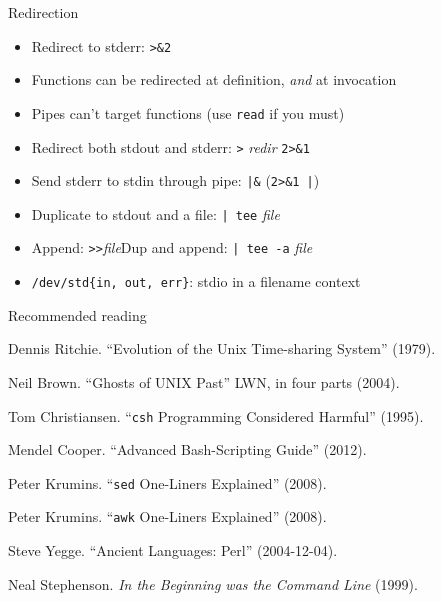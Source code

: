 \documentclass[mathserif,xcolor={dvipsnames,table}]{beamer}
\begin{document}
\begin{frame}{Redirection}
\begin{itemize}
\item Redirect to stderr: \texttt{>\&2}
\item Functions can be redirected at definition, \textit{and} at invocation
\item Pipes can't target functions (use \texttt{read} if you must)
\item Redirect both stdout and stderr: \texttt{>} \textit{redir} \texttt{2>\&1}
\item Send stderr to stdin through pipe: \texttt{|\&} (\texttt{2>\&1 |})
\item Duplicate to stdout and a file: \texttt{| tee} \textit{file}
\item Append: \texttt{>}\texttt{>}\textit{file}\hfill Dup and append: \texttt{| tee -a} \textit{file}
\item \texttt{/dev/std\{in, out, err\}}: stdio in a filename context
\end{itemize}
\end{frame}

\begin{frame}{Recommended reading}
\begin{itemize}
\small{
\item Dennis Ritchie. ``Evolution of the Unix Time-sharing System'' (1979).
\item Neil Brown. ``Ghosts of UNIX Past'' LWN, in four parts (2004).
\item Tom Christiansen. ``\texttt{csh} Programming Considered Harmful'' (1995).
\item Mendel Cooper. ``Advanced Bash-Scripting Guide'' (2012).
\item Peter Krumins. ``\texttt{sed} One-Liners Explained'' (2008).
\item Peter Krumins. ``\texttt{awk} One-Liners Explained'' (2008).
\item Steve Yegge. ``Ancient Languages: Perl'' (2004-12-04).
\item Neal Stephenson. \textit{In the Beginning was the Command Line} (1999).
}
\end{itemize}
\end{frame}
\end{document}

